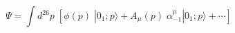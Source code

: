 \begin{equation}
\Psi =
\int d^{26}p \;
\left[ \phi (p)\; | 0_1; p \rangle + A_\mu (p) \; \alpha^\mu_{-1} | 0_1; p
\rangle + \cdots \right]
 \label{eq:field-expansion}
\end{equation}

